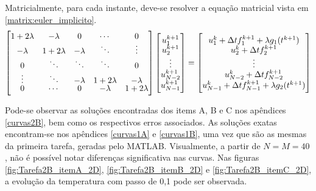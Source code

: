 \documentclass[12pt]{article}
\begin{document}
\begin{spacing}{1.5}
Matricialmente, para cada instante, deve-se resolver a equação matricial vista em \eqref{matrix:euler_implicito}.
\begin{gather}\label{matrix:euler_implicito}
    \renewcommand*{\arraystretch}{0.75}
    \begin{bmatrix}
    1+2\lambda & -\lambda & 0 & \cdots & 0\\
    -\lambda & 1+2\lambda & -\lambda & \ddots & \vdots\\
    0 & \ddots & \ddots & \ddots & 0 \\
    \vdots & \ddots & -\lambda & 1+2\lambda & -\lambda \\
    0 & \cdots & 0 & -\lambda & 1+2\lambda
    \end{bmatrix}
    \begin{bmatrix}
    u_1^{k+1} \\
    u_2^{k+1} \\
    \vdots \\
    u_{N-2}^{k+1} \\
    u_{N-1}^{k+1}
    \end{bmatrix}
    =
    \begin{bmatrix}
    u_1^k + \Delta t f_1^{k+1} + \lambda g_1(t^{k+1}) \\
    u_2^k + \Delta t f_2^{k+1} \\
    \vdots \\
    u_{N-2}^k + \Delta t f_{N-2}^{k+1} \\
    u_{N-1}^k + \Delta t f_{N-1}^{k+1} + \lambda g_2(t^{k+1})
    \end{bmatrix}
\end{gather}

 Pode-se observar as soluções encontradas dos items A, B e C nos apêndices \ref{curvas2B}, bem como os respectivos erros associados. As soluções exatas encontram-se nos apêndices \ref{curvas1A} e \ref{curvas1B}, uma vez que são as mesmas da primeira tarefa, geradas pelo MATLAB. Visualmente, a partir de $N=M=40$, não é possível notar diferenças significativa nas curvas. Nas figuras \ref{fig:Tarefa2B_itemA_2D}, \ref{fig:Tarefa2B_itemB_2D} e \ref{fig:Tarefa2B_itemC_2D}, a evolução da temperatura com passo de 0,1 pode ser observada.


\end{spacing}
\end{document}
